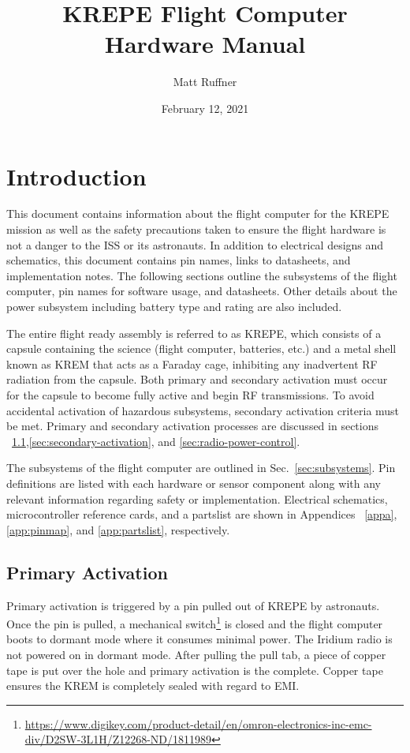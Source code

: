 \documentclass{article}
\title{KREPE Flight Computer Hardware Manual}
\author{Matt Ruffner}
\date{February 12, 2021}
\begin{document}
\maketitle
\tableofcontents
\listoffigures
\listoftables
\newpage


\section{Introduction}

This document contains information about the flight computer for the KREPE mission as well as the safety precautions taken to ensure the flight hardware is not a danger to the ISS or its astronauts. In addition to electrical designs and schematics, this document contains pin names, links to datasheets, and implementation notes. The following sections outline the subsystems of the flight computer, pin names for software usage, and datasheets. Other details about the power subsystem including battery type and rating are also included. 

The entire flight ready assembly is referred to as KREPE, which consists of a capsule containing the science (flight computer, batteries, etc.) and a metal shell known as KREM that acts as a Faraday cage, inhibiting any inadvertent RF radiation from the capsule. Both primary and secondary activation must occur for the capsule to become fully active and begin RF transmissions. To avoid accidental activation of hazardous subsystems, secondary activation criteria must be met. Primary and secondary activation processes are discussed in sections ~\ref{sec:primary-activation},\ref{sec:secondary-activation}, and \ref{sec:radio-power-control}.

The subsystems of the flight computer are outlined in Sec.~\ref{sec:subsystems}. Pin definitions are listed with each hardware or sensor component along with any relevant information regarding safety or implementation. Electrical schematics, microcontroller reference cards, and a partslist are shown in  Appendices ~\ref{appa}, \ref{app:pinmap}, and \ref{app:partslist}, respectively.


\subsection{Primary Activation}
\label{sec:primary-activation}
Primary activation is triggered by a pin pulled out of KREPE by astronauts. Once the pin is pulled, a mechanical switch\footnote{\url{https://www.digikey.com/product-detail/en/omron-electronics-inc-emc-div/D2SW-3L1H/Z12268-ND/1811989}} is closed and the flight computer boots to dormant mode where it consumes minimal power. The Iridium radio is not powered on in dormant mode. After pulling the pull tab, a piece of copper tape is put over the hole and primary activation is the complete. Copper tape ensures the KREM is completely sealed with regard to EMI. 
\end{document}
